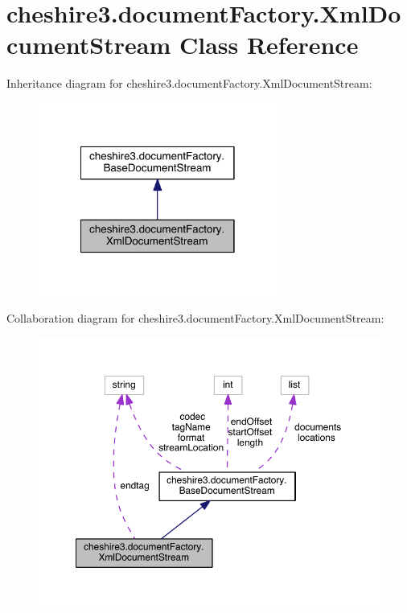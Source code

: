 \hypertarget{classcheshire3_1_1document_factory_1_1_xml_document_stream}{\section{cheshire3.\-document\-Factory.\-Xml\-Document\-Stream Class Reference}
\label{classcheshire3_1_1document_factory_1_1_xml_document_stream}
}


Inheritance diagram for cheshire3.\-document\-Factory.\-Xml\-Document\-Stream\-:
\nopagebreak
\begin{figure}[H]
\begin{center}
\leavevmode
\includegraphics[width=222pt]{classcheshire3_1_1document_factory_1_1_xml_document_stream__inherit__graph}
\end{center}
\end{figure}


Collaboration diagram for cheshire3.\-document\-Factory.\-Xml\-Document\-Stream\-:
\nopagebreak
\begin{figure}[H]
\begin{center}
\leavevmode
\includegraphics[width=350pt]{classcheshire3_1_1document_factory_1_1_xml_document_stream__coll__graph}
\end{center}
\end{figure}
